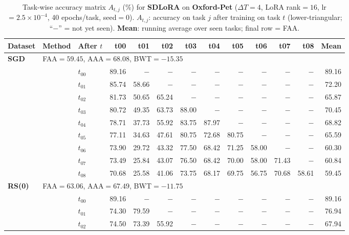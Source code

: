 \begin{table}[ht]
\centering
\caption{%
  Task-wise accuracy matrix $A_{t,j}$ (\%) for \textbf{SDLoRA} on \textbf{Oxford-Pet} ($\Delta T=4$, LoRA rank$=16$, lr$=2.5\times10^{-4}$, 40 epochs/task, seed$=0$).
  $A_{t,j}$: accuracy on task $j$ after training on task $t$  (lower-triangular; ``$-$'' = not yet seen).
  \textbf{Mean}: running average over seen tasks; final row = FAA.
}
\label{tab:raw_sdlora_pets}
\setlength{\tabcolsep}{2.8pt}
\renewcommand{\arraystretch}{0.88}
\scriptsize
\begin{tabular}{@{}l l l *{10}{r}@{}}
\toprule
\textbf{Dataset} & \textbf{Method} & \textbf{After $t$} & \textbf{t00} & \textbf{t01} & \textbf{t02} & \textbf{t03} & \textbf{t04} & \textbf{t05} & \textbf{t06} & \textbf{t07} & \textbf{t08} & \textbf{Mean} \\
\midrule
\multirow{10}{*}{\textbf{SGD}} & \multicolumn{11}{l}{\quad\small FAA$=59.45$,\; AAA$=68.08$,\; BWT$=-15.35$} \\
 & & $t_{00}$ & 89.16 & $-$ & $-$ & $-$ & $-$ & $-$ & $-$ & $-$ & $-$ & 89.16 \\
 & & $t_{01}$ & 85.74 & 58.66 & $-$ & $-$ & $-$ & $-$ & $-$ & $-$ & $-$ & 72.20 \\
 & & $t_{02}$ & 81.73 & 50.65 & 65.24 & $-$ & $-$ & $-$ & $-$ & $-$ & $-$ & 65.87 \\
 & & $t_{03}$ & 80.72 & 49.35 & 63.73 & 88.00 & $-$ & $-$ & $-$ & $-$ & $-$ & 70.45 \\
 & & $t_{04}$ & 78.71 & 37.73 & 55.92 & 83.75 & 87.97 & $-$ & $-$ & $-$ & $-$ & 68.82 \\
 & & $t_{05}$ & 77.11 & 34.63 & 47.61 & 80.75 & 72.68 & 80.75 & $-$ & $-$ & $-$ & 65.59 \\
 & & $t_{06}$ & 73.90 & 29.72 & 43.32 & 77.50 & 68.42 & 71.25 & 58.00 & $-$ & $-$ & 60.30 \\
 & & $t_{07}$ & 73.49 & 25.84 & 43.07 & 76.50 & 68.42 & 70.00 & 58.00 & 71.43 & $-$ & 60.84 \\
 & & $t_{08}$ & 70.68 & 25.58 & 41.06 & 73.75 & 68.17 & 69.75 & 56.75 & 70.68 & 58.61 & 59.45 \\
\midrule
\multirow{10}{*}{\textbf{RS(0)}} & \multicolumn{11}{l}{\quad\small FAA$=63.06$,\; AAA$=67.49$,\; BWT$=-11.75$} \\
 & & $t_{00}$ & 89.16 & $-$ & $-$ & $-$ & $-$ & $-$ & $-$ & $-$ & $-$ & 89.16 \\
 & & $t_{01}$ & 74.30 & 79.59 & $-$ & $-$ & $-$ & $-$ & $-$ & $-$ & $-$ & 76.94 \\
 & & $t_{02}$ & 74.50 & 73.39 & 55.92 & $-$ & $-$ & $-$ & $-$ & $-$ & $-$ & 67.94 \\

\end{tabular}
\end{table}
